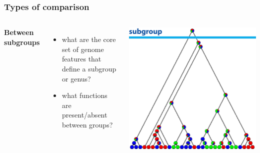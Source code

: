 %
\begin{frame}
  \frametitle{Types of comparison}
    \begin{columns}[T] 
        \textcolor{RawSienna}{\textbf{Between subgroups}}
        \begin{itemize}
          \item what are the core set of genome features that define a subgroup or genus?
          \item what functions are present/absent between groups?
        \end{itemize}
        \includegraphics[width=\textwidth]{images/cladogram_subgroup}
    \end{columns}  
\end{frame}